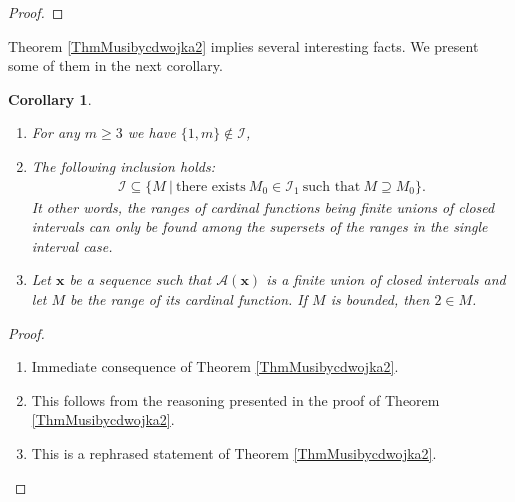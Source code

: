 \documentclass{amsart}
\newtheorem{corollary}[theorem]{Corollary}
\theoremstyle{definition}
\newcommand{\rng}{{\rm rng} \hspace{0.03cm}}
\begin{document}
\begin{proof}
 
\end{proof}


Theorem \ref{ThmMusibycdwojka2} implies several interesting facts. We present some of them in the next corollary.

\begin{corollary}\label{CorManyCors}
\begin{enumerate}[label={(\arabic*)},ref={\thecorollary(\arabic*)}]
	\item For any $m\geq 3$ we have $\{1,m\}\notin \mathcal{I}$, \label{nienalezydosumy}
	\item The following inclusion holds: 
	\begin{align*}
	\mathcal{I}\subseteq \{M \ | \ \text{there exists} \ M_0\in \mathcal{I}_1 \ \text{such that} \ M\supseteq M_0 \}.
	\end{align*}		
	It other words, the ranges of cardinal functions being finite unions of closed intervals can only be found among the supersets of the ranges in the single interval case. \label{nadzbiory}
	\item Let $\mathbf{x}$ be a sequence such that $\mathcal{A}(\mathbf{x})$ is a finite union of closed intervals and let $M$ be the range of its cardinal function. If $M$ is bounded, then $2\in M$. \label{dwojkawsumachprzedzialow} 
\end{enumerate}
\end{corollary}
\begin{proof}
	\begin{enumerate}
		\item Immediate consequence of Theorem \ref{ThmMusibycdwojka2}.
		\item This follows from the reasoning presented in the proof of Theorem \ref{ThmMusibycdwojka2}.
		\item This is a rephrased statement of Theorem \ref{ThmMusibycdwojka2}.
	\end{enumerate}
\end{proof}
\end{document}

